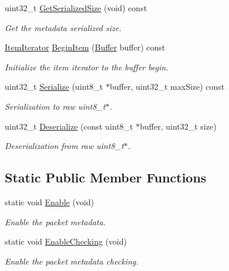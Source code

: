 \begin{DoxyCompactItemize}
uint32\+\_\+t \hyperlink{classns3_1_1PacketMetadata_a8d399798f5b18fc287a772914bfd9386}{Get\+Serialized\+Size} (void) const 
\begin{DoxyCompactList}\small\item\em Get the metadata serialized size. \end{DoxyCompactList}\item 
\hyperlink{classns3_1_1PacketMetadata_1_1ItemIterator}{Item\+Iterator} \hyperlink{classns3_1_1PacketMetadata_aa574c0500da92d42d3cb53ae8a9fd0ad}{Begin\+Item} (\hyperlink{classns3_1_1Buffer}{Buffer} buffer) const 
\begin{DoxyCompactList}\small\item\em Initialize the item iterator to the buffer begin. \end{DoxyCompactList}\item 
uint32\+\_\+t \hyperlink{classns3_1_1PacketMetadata_aae036ce6844106a8a3ce88e0e095a7eb}{Serialize} (uint8\+\_\+t $\ast$buffer, uint32\+\_\+t max\+Size) const 
\begin{DoxyCompactList}\small\item\em Serialization to raw uint8\+\_\+t$\ast$. \end{DoxyCompactList}\item 
uint32\+\_\+t \hyperlink{classns3_1_1PacketMetadata_a88efb0a5ff0339b9430ded4e3452397d}{Deserialize} (const uint8\+\_\+t $\ast$buffer, uint32\+\_\+t size)
\begin{DoxyCompactList}\small\item\em Deserialization from raw uint8\+\_\+t$\ast$. \end{DoxyCompactList}\end{DoxyCompactItemize}
\subsection*{Static Public Member Functions}
\begin{DoxyCompactItemize}
\item 
static void \hyperlink{classns3_1_1PacketMetadata_addee67896039c1a356ee47698b04e953}{Enable} (void)
\begin{DoxyCompactList}\small\item\em Enable the packet metadata. \end{DoxyCompactList}\item 
static void \hyperlink{classns3_1_1PacketMetadata_a5bb19e2208a6a0573cdc79c3959ac6b4}{Enable\+Checking} (void)
\begin{DoxyCompactList}\small\item\em Enable the packet metadata checking. \end{DoxyCompactList}\end{DoxyCompactItemize}
